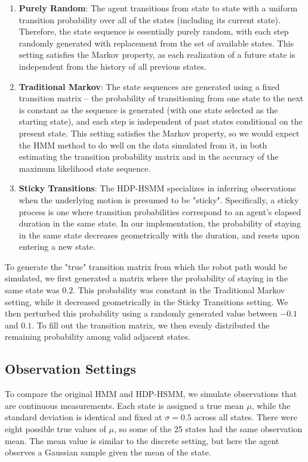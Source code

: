 \documentclass{article}
\begin{document}
\begin{enumerate}
	\item \textbf{Purely Random}: The agent transitions from state to state with a uniform transition probability over all of the states (including its current state). Therefore, the state sequence is essentially purely random, with each step randomly generated with replacement from the set of available states. This setting satisfies the Markov property, as each realization of a future state is independent from the history of all previous states.
	\item \textbf{Traditional Markov}: The state sequences are generated using a fixed transition matrix -- the probability of transitioning from one state to the next is constant as the sequence is generated (with one state selected as the starting state), and each step is independent of past states conditional on the present state. This setting satisfies the Markov property, so we would expect the HMM method to do well on the data simulated from it, in both estimating the transition probability matrix and in the accuracy of the maximum likelihood state sequence.
	\item \textbf{Sticky Transitions}: The HDP-HSMM specializes in inferring observations when the underlying motion is presumed to be "sticky". Specifically, a sticky process is one where transition probabilities correspond to an agent's elapsed duration in the same state. In our implementation, the probability of staying in the same state decreases geometrically with the duration, and resets upon entering a new state.
 \end{enumerate}

To generate the "true" transition matrix from which the robot path would be simulated, we first generated a matrix where the probability of staying in the same state was $0.2$. This probability was constant in the Traditional Markov setting, while it decreased geometrically in the Sticky Transitions setting. We then perturbed this probability using a randomly generated value between $-0.1$ and $0.1$. To fill out the transition matrix, we then evenly distributed the remaining probability among valid adjacent states.

\subsection{Observation Settings}

To compare the original HMM and HDP-HSMM, we simulate observations that are continuous measurements. Each state is assigned a true mean $\mu$, while the standard deviation is identical and fixed at $\sigma = 0.5$ across all states. There were eight possible true values of $\mu$, so some of the 25 states had the same observation mean. The mean value is similar to the discrete setting, but here the agent observes a Gaussian sample given the mean of the state.
\end{document}
